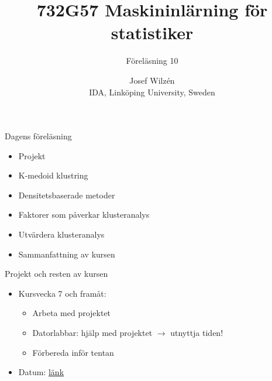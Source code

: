 \documentclass[10pt,english]{beamer}
\title{732G57 Maskininlärning för statistiker}
\subtitle{Föreläsning 10}
\date{}
\author{Josef Wilzén \\ IDA, Linköping University, Sweden}
\begin{document}
\maketitle

\begin{frame}{Dagens föreläsning}

    \begin{itemize}
        \item Projekt
        \item K-medoid klustring
        \item Densitetsbaserade metoder
        \item Faktorer som påverkar klusteranalys
        \item Utvärdera klusteranalys
        \item Sammanfattning av kursen
    \end{itemize}
    
\end{frame}

\begin{frame}{Projekt och resten av kursen}
    
  \begin{itemize}
        \item Kursvecka 7 och framåt: 
        \begin{itemize}
          \item Arbeta med projektet
          \item Datorlabbar: hjälp med projektet $\rightarrow$ utnyttja tiden!
          \item Förbereda inför tentan
        \end{itemize}
        \item Datum: \href{https://raw.githubusercontent.com/STIMALiU/732G57_ML/refs/heads/main/project/Datum_ht2025.pdf}{länk}
    \end{itemize}

\end{frame}
\end{document}
